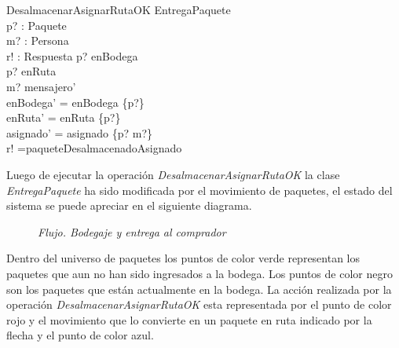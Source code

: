 \documentclass[12pt,a4paper]{article}
\begin{document}
\begin{schema}{DesalmacenarAsignarRutaOK}
\Delta EntregaPaquete\\
p? : Paquete\\
m? : Persona\\
r! : Respuesta
\where
p? \in enBodega\\
p? \notin  enRuta\\
m? \in mensajero'\\
enBodega' = enBodega \setminus \{p?\}\\
enRuta' = enRuta \cup \{p?\}\\
asignado' = asignado \cup \{p? \mapsto m?\}\\
r! =paqueteDesalmacenadoAsignado
\end{schema}

Luego de ejecutar la operación \textit{DesalmacenarAsignarRutaOK} la clase \textit{EntregaPaquete} ha sido modificada por el movimiento de paquetes, el estado del sistema se puede apreciar en el siguiente diagrama.

\begin{figure}[h]
\centering
{}
\caption{\textit{Flujo. Bodegaje y entrega al comprador}} \label{fig:M1}
\end{figure}
Dentro del universo de paquetes los puntos de color verde representan los paquetes que aun no han sido ingresados a la bodega. Los puntos de color negro son los paquetes que están actualmente en la bodega. La acción realizada por la operación \textit{DesalmacenarAsignarRutaOK} esta representada por el punto de color rojo y el movimiento que lo convierte en un paquete en ruta indicado por la flecha y el punto de color azul.
\end{document}
